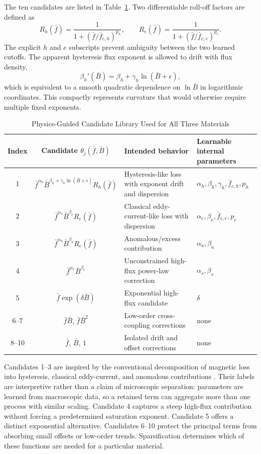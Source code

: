 \documentclass[lettersize,journal]{IEEEtran}
\newcommand{\fbar}{\bar{f}}
\newcommand{\Bbar}{\bar{B}}
\begin{document}
The ten candidates are listed in Table~\ref{tab:library}. Two differentiable roll-off factors are defined as
\begin{equation}
 R_h(\fbar)=\frac{1}{1+(\fbar/\bar f_{c,h})^{p_h}},\qquad
 R_e(\fbar)=\frac{1}{1+(\fbar/\bar f_{c,e})^{p_e}}.
 \label{eq:rolloff}
\end{equation}
The explicit $h$ and $e$ subscripts prevent ambiguity between the two learned cutoffs. The apparent hysteresis flux exponent is allowed to drift with flux density,
\begin{equation}
 \beta_h'(\Bbar)=\beta_h+\gamma_h\ln(\Bbar+\epsilon),
 \label{eq:drift}
\end{equation}
which is equivalent to a smooth quadratic dependence on $\ln\Bbar$ in logarithmic coordinates. This compactly represents curvature that would otherwise require multiple fixed exponents.

\begin{table}[t]
\centering
\caption{Physics-Guided Candidate Library Used for All Three Materials}
\label{tab:library}
\renewcommand{\arraystretch}{1.15}
\begin{tabular}{ccll}
\toprule
Index & Candidate $\theta_j(\fbar,\Bbar)$ & Intended behavior & Learnable internal parameters \\
\midrule
1 & $\fbar^{\alpha_h}\Bbar^{\beta_h+\gamma_h\ln(\Bbar+\epsilon)}R_h(\fbar)$ & Hysteresis-like loss with exponent drift and dispersion & $\alpha_h,\beta_h,\gamma_h,\bar f_{c,h},p_h$ \\
2 & $\fbar^{\alpha_e}\Bbar^{\beta_e}R_e(\fbar)$ & Classical eddy-current-like loss with dispersion & $\alpha_e,\beta_e,\bar f_{c,e},p_e$ \\
3 & $\fbar^{\alpha_a}\Bbar^{\beta_a}R_e(\fbar)$ & Anomalous/excess contribution & $\alpha_a,\beta_a$ \\
4 & $\fbar^{\alpha_s}\Bbar^{\beta_s}$ & Unconstrained high-flux power-law correction & $\alpha_s,\beta_s$ \\
5 & $\fbar\exp(\delta\Bbar)$ & Exponential high-flux candidate & $\delta$ \\
6--7 & $\fbar\Bbar$, $\fbar\Bbar^2$ & Low-order cross-coupling corrections & none \\
8--10 & $\fbar$, $\Bbar$, $1$ & Isolated drift and offset corrections & none \\
\bottomrule
\end{tabular}
\end{table}

Candidates 1--3 are inspired by the conventional decomposition of magnetic loss into hysteresis, classical eddy-current, and anomalous contributions \cite{1041954}. Their labels are interpretive rather than a claim of microscopic separation: parameters are learned from macroscopic data, so a retained term can aggregate more than one process with similar scaling. Candidate 4 captures a steep high-flux contribution without forcing a predetermined saturation exponent. Candidate 5 offers a distinct exponential alternative. Candidates 6--10 protect the principal terms from absorbing small offsets or low-order trends. Sparsification determines which of these functions are needed for a particular material.
\end{document}
